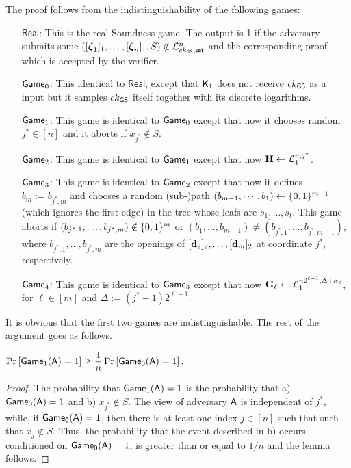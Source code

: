 The proof follows from the indistinguishability of the following games:
\begin{itemize}
\item[\(\mathsf{Real}\):] This is the real Soundness game. The output is 1 if the adversary submits some \(([{\boldsymbol \zeta}_1]_1,\ldots,[{\boldsymbol \zeta}_n]_1,S)\notin\mathcal{L}_{ck_{\mathsf{GS}},\mathsf{set}}^n\) and the corresponding proof which is accepted by the verifier.
\item[\(\mathsf{Game}_0\):] This identical to \(\mathsf{Real}\), except that \(\mathsf{K}_1\) does not receive \(ck_{\mathsf{GS}}\) as a input but
it samples \(ck_{\mathsf{GS}}\) itself together with its discrete logarithms.
\item[\(\mathsf{Game}_1\):] This game is identical to \(\mathsf{Game}_0\) except that now it chooses random \(j^*\in[n]\) and it aborts if \(x_{j^*}\notin S\).
\item[\(\mathsf{Game}_2\):] This game is identical to \(\mathsf{Game}_1\) except that now \(\mathbf{{H}}\gets\mathcal{L}^{n,j^*}_1\).
\item[\(\mathsf{Game}_3\):] This game is identical to \(\mathsf{Game}_2\) except that now it defines $b_m:=b_{j^*,m}$ and chooses a random (sub-)path $(b_{m-1},\cdots, b_1)\gets\{0,1\}^{m-1}$ (which ignores the first edge) in the tree whose leafs are $s_1,\ldots,s_t$. This game aborts if \((b_{j^*,1},\ldots,b_{j^*,m})\notin\{0,1\}^m\) or \((b_1,\ldots, b_{m-1})\neq(b_{j^*,1},\ldots, b_{j^*,m-1})\), where \(b_{j^*,1},\ldots,b_{j^*,m}\) are the openings of \([\mathbf{d}_2]_2,\ldots,[\mathbf{d}_m]_2\) at coordinate \(j^*\), respectively.
\item[\(\mathsf{Game}_4\):] This game is identical to \(\mathsf{Game}_3\) except that now \(\mathbf{{G}}_\ell\gets\mathcal{L}_1^{n2^{\ell-1},\Delta+\alpha_\ell}\), for \(\ell\in [m]\) and $\Delta:=(j^*-1)2^{\ell-1}$.
\end{itemize}

It is obvious that the first two games are indistinguishable. The rest of the argument goes as follows.

\begin{lemma}
\(\Pr\left[ \mathsf{Game}_1(\mathsf{A})=1\right]\geq\dfrac{1}{n}\Pr\left[\mathsf{Game}_0(\mathsf{A})=1\right].\)
\end{lemma}

\begin{proof}  The probability that
 \(\mathsf{Game}_1(\mathsf{A})=1\) is the probability that  a) \(\mathsf{Game}_0(\mathsf{A})=1\) and
b)  \(x_{j^*} \notin S\). The view of adversary \(\mathsf{A}\) is independent of \(j^*\), while, if \(\mathsf{Game_0}(\mathsf{A})=1\), then there is at least one index \(j \in [n]\) such that  
such that  \(x_{j} \notin S\). Thus, 
the probability that the event described in b) occurs conditioned on \(\mathsf{Game_0}(\mathsf{A})=1\), is greater than or equal to \(1/n\) and the lemma follows.
\end{proof}

